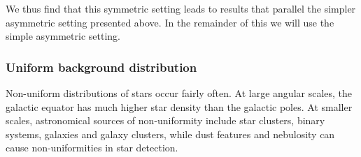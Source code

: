 We thus find that this symmetric setting leads to results that
parallel the simpler asymmetric setting presented above.  In the
remainder of this \doctype we will use the simple asymmetric setting.



















\subsubsection{Uniform background distribution}


Non-uniform distributions of stars occur fairly often.  At large
angular scales, the galactic equator has much higher star density than
the galactic poles.  At smaller scales, astronomical sources of
non-uniformity include star clusters, binary systems, galaxies and
galaxy clusters, while dust features and nebulosity can cause
non-uniformities in star detection.


